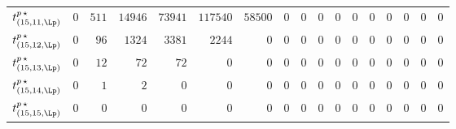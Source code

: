 \begin{tabular}{r|rrrrrrrrrrrrrrrr}
  $t^{p \, \star}_{(15,11,\Lp)}$ & $0$ & $511$ & $14946$ & $73941$ & $117540$ & $58500$ & $0$ & $0$ & $0$ & $0$ & $0$ & $0$ & $0$ & $0$ & $0$ & $0$ \\
  $t^{p \, \star}_{(15,12,\Lp)}$ & $0$ & $96$ & $1324$ & $3381$ & $2244$ & $0$ & $0$ & $0$ & $0$ & $0$ & $0$ & $0$ & $0$ & $0$ & $0$ & $0$ \\
  $t^{p \, \star}_{(15,13,\Lp)}$ & $0$ & $12$ & $72$ & $72$ & $0$ & $0$ & $0$ & $0$ & $0$ & $0$ & $0$ & $0$ & $0$ & $0$ & $0$ & $0$ \\
  $t^{p \, \star}_{(15,14,\Lp)}$ & $0$ & $1$ & $2$ & $0$ & $0$ & $0$ & $0$ & $0$ & $0$ & $0$ & $0$ & $0$ & $0$ & $0$ & $0$ & $0$ \\
  $t^{p \, \star}_{(15,15,\Lp)}$ & $0$ & $0$ & $0$ & $0$ & $0$ & $0$ & $0$ & $0$ & $0$ & $0$ & $0$ & $0$ & $0$ & $0$ & $0$ & $0$ \\
\end{tabular}
